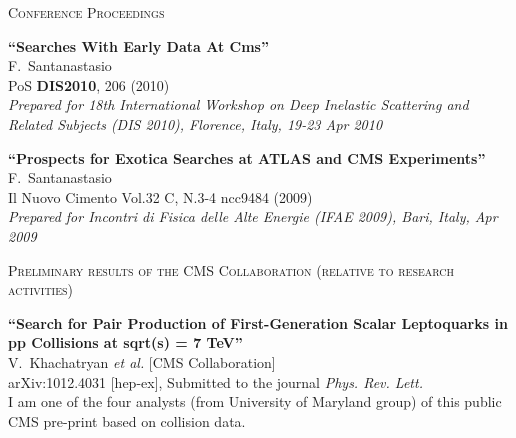 \documentclass[10pt, a4paper]{article}
\begin{document}
\begin{thebibliography}{599}
\vspace{0.1cm} \begin{center} \textsc{Conference Proceedings} \end{center} \vspace{0.05cm}

{\bf ``Searches With Early Data At Cms''}
  \\{}F.~Santanastasio
  \\{}PoS {\bf DIS2010}, 206 (2010)
\\{}{\it Prepared for 18th International Workshop on Deep Inelastic Scattering and Related Subjects (DIS 2010), Florence, Italy, 19-23 Apr 2010}

{\bf ``Prospects for Exotica Searches at ATLAS and CMS Experiments''}
  \\{}F.~Santanastasio
  \\{}Il Nuovo Cimento Vol.32 C, N.3-4 ncc9484 (2009)
\\{}{\it Prepared for Incontri di Fisica delle Alte Energie (IFAE 2009), Bari, Italy, Apr 2009}

\vspace{0.1cm} \begin{center} \textsc{Preliminary results of the CMS Collaboration (relative to research activities)} \end{center} \vspace{0.05cm}

{\bf ``Search for Pair Production of First-Generation Scalar Leptoquarks in pp Collisions at sqrt(s) = 7 TeV''}
  \\{}V.~Khachatryan {\it et al.}  [CMS Collaboration]
  \\{}arXiv:1012.4031 [hep-ex], Submitted to the journal {\it Phys. Rev. Lett.}
  \\I am one of the four analysts (from University of Maryland group) of this public CMS pre-print based on collision data.


\end{thebibliography}
\end{document}
